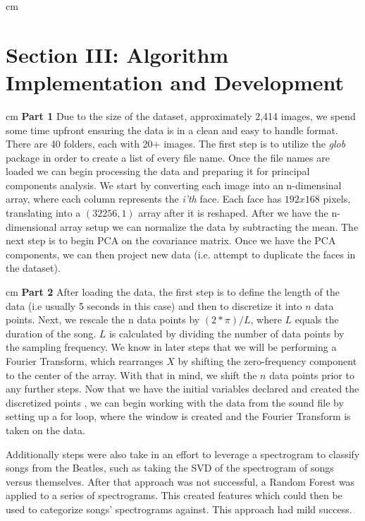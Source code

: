 \documentclass{cup-pan}
\begin{document}
 cm
\noindent

\section{Section III:  Algorithm Implementation and Development}
 cm
\noindent
\textbf{Part 1}
\noindent
Due to the size of the dataset, approximately 2,414 images, we spend some time upfront ensuring the data is in a clean and easy to handle format.  There are 40 folders, each with 20+ images.  The first step is to utilize the \emph{glob} package in order to create a list of every file name.  Once the file names are loaded we can begin processing the data and preparing it for principal components analysis. 
\noindent
We start by converting each image into an n-dimensinal array, where each column represents the \emph{i'th} face.  Each face has $192 x 168$ pixels, translating into a $(32256,1)$ array after it is reshaped.  After we have the n-dimensional array setup we can normalize the data by subtracting the mean. The next step is to begin PCA on the covariance matrix.  Once we have the PCA components, we can then project new data (i.e. attempt to duplicate the faces in the dataset).  

 cm
\noindent
\textbf{Part 2}
\noindent
After loading the data, the first step is to define the length of the data (i.e usually 5 seconds in this case) and then to discretize it into $n$ data points. Next, we rescale the n data points by $(2* \pi)/L$, where $L$ equals the duration of the song. $L$ is calculated by dividing the number of data points by the sampling frequency. We know in later steps that we will be performing a Fourier Transform, which rearranges $X$ by shifting the zero-frequency component to the center of the array. With that in mind, we shift the $n$ data points prior to any further steps. Now that we have the initial variables declared and created the discretized points , we can begin working with the data from the sound file by setting up a for loop, where the window is created and the Fourier Transform is taken on the data.

Additionally steps were also take in an effort to leverage a spectrogram to classify songs from the Beatles, such as taking the SVD of the spectrogram of songs versus themselves.  After that approach was not successful, a Random Forest was applied to a series of spectrograms.  This created features which could then be used to categorize songs' spectrograms against.  This approach had mild success. 
\end{document}
